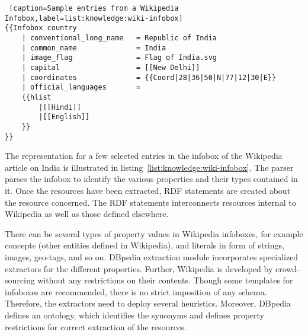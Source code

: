 \begin{lstlisting} [caption=Sample entries from a Wikipedia Infobox,label=list:knowledge:wiki-infobox]
{{Infobox country
    | conventional_long_name   = Republic of India
    | common_name              = India
    | image_flag               = Flag of India.svg
    | capital                  = [[New Delhi]]
    | coordinates              = {{Coord|28|36|50|N|77|12|30|E}}
    | official_languages       = 
    {{hlist
        |[[Hindi]]
        |[[English]]
    }}
}}
\end{lstlisting}

The representation for a few selected entries in the infobox of the Wikipedia article on India is illustrated in 
listing~\ref{list:knowledge:wiki-infobox}. The parser parses the infobox to identify the various properties and 
their types contained in it. Once the resources have been extracted, RDF statements are created about the resource
concerned. The RDF statements interconnects resources internal to Wikipedia as well as those defined elsewhere.

There can be several types of property values in Wikipedia infoboxes, for example concepts (other entities defined in 
Wikipedia), and literals in form of strings, images, geo-tags, and so on. DBpedia extraction module incorporates specialized 
extractors for the different properties. Further, Wikipedia is developed by crowd-sourcing without any restrictions 
on their contents. Though some templates for infoboxes are recommended, there is no strict imposition of any schema. Therefore,
the extractors need to deploy several heuristics. Moreover, DBpedia defines an ontology, which identifies 
the synonyms and defines property restrictions for correct extraction of the resources.
